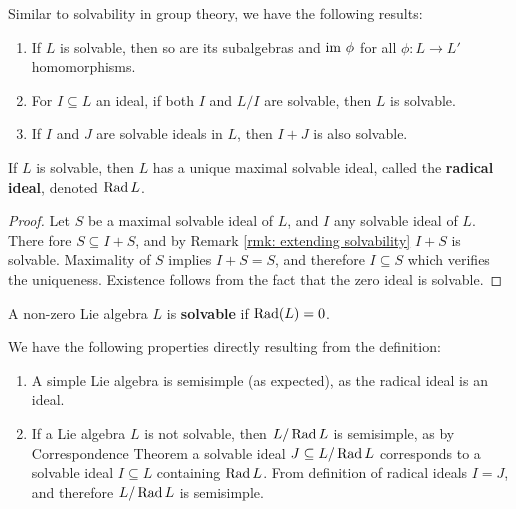 \documentclass{article}
\begin{document}
\begin{remark}\label{rmk: extending solvability}
    Similar to solvability in group theory, we have the following results:
    \begin{enumerate}
        \item If $L$ is solvable, then so are its subalgebras and $\mathrm{im}\  \phi$ for all $\phi: L \to L'$ homomorphisms.
        \item For $I \subseteq L$ an ideal, if both $I$ and $L/I$ are solvable, then $L$ is solvable.
        \item If $I$ and $J$ are solvable ideals in $L$, then $I + J$ is also solvable.   
    \end{enumerate}
\end{remark}

\begin{corollary}
    If $L$ is solvable, then $L$ has a unique maximal solvable ideal, called the \textbf{radical ideal}, denoted $\operatorname{Rad} L$.
\end{corollary}

\begin{proof}
    Let $S$ be a maximal solvable ideal of $L$, and $I$ any solvable ideal of $L$. There fore $S \subseteq I + S$, and by Remark \ref{rmk: extending solvability} $I + S$ is solvable. Maximality of $S$ implies $I + S = S$, and therefore $I \subseteq S$ which verifies the uniqueness. Existence follows from the fact that the zero ideal is solvable.
\end{proof}

\begin{definition}
    A non-zero Lie algebra $L$ is \textbf{solvable} if $\operatorname{Rad}(L) = 0$.
\end{definition}

\begin{remark}
    We have the following properties directly resulting from the definition:
    \begin{enumerate}
        \item A simple Lie algebra is semisimple (as expected), as the radical ideal is an ideal.
        \item If a Lie algebra $L$ is not solvable, then $L/\operatorname{Rad} L$ is semisimple, as by Correspondence Theorem a solvable ideal $J \subseteq L/\operatorname{Rad} L$ corresponds to a solvable ideal $I \subseteq L$ containing $\operatorname{Rad} L$. From definition of radical ideals $I = J$, and therefore $L/\operatorname{Rad} L$ is semisimple.
    \end{enumerate}
\end{remark}
\end{document}
